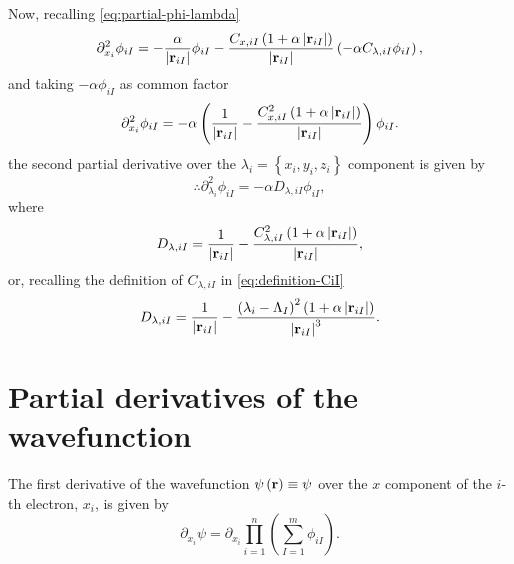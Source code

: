 Now, recalling \cref{eq:partial-phi-lambda}
\begin{equation}
    \partial_{x_{i}}^{2} \phi_{iI}
    =
    -
    \frac{
        \alpha
    }{
        \left| \boldsymbol{\mathrm{r}}_{iI} \right|
    }
    \phi_{iI}
    -
    \frac{
        C_{x,iI}
        \left( 
            1 + \alpha \left| \boldsymbol{\mathrm{r}}_{iI} \right|
        \right)
    }{
        \left| \boldsymbol{\mathrm{r}}_{iI} \right|
    }
    \left( 
        -\alpha
        C_{\lambda,iI}
        \phi_{iI}
    \right)
    ,
\end{equation}
and taking $-\alpha \phi_{iI}$ as common factor
\begin{equation}
    \partial_{x_{i}}^{2} \phi_{iI}
    =
    - \alpha
    \left( 
        \frac{
            1
        }{
            \left| \boldsymbol{\mathrm{r}}_{iI} \right|
        }
        -
        \frac{
            C_{x,iI}^{2}
            \left( 
                1 + \alpha \left| \boldsymbol{\mathrm{r}}_{iI} \right|
            \right)
        }{
            \left| \boldsymbol{\mathrm{r}}_{iI} \right|
        }
    \right)
    \phi_{iI}
    .
\end{equation}
the second partial derivative over the 
$\lambda_i = \left\{ x_i, y_i, z_i \right\}$
component is given by
\begin{equation} \label{eq:partial-2-phi-lambda}
    \therefore
    \partial_{\lambda_{i}}^{2} \phi_{iI}
    =
    -\alpha
    D_{\lambda,iI}
    \phi_{iI}
    ,
\end{equation}
where 
\begin{equation} \label{eq:coeficiente-DiI-CiI}
    D_{\lambda,iI}
    =
    \frac{
        1
    }{
        \left| \boldsymbol{\mathrm{r}}_{iI} \right|
    }
    -
    \frac{
        C_{\lambda,iI}^{2}
        \left( 
            1 + \alpha \left| \boldsymbol{\mathrm{r}}_{iI} \right|
        \right)
    }{
        \left| \boldsymbol{\mathrm{r}}_{iI} \right|
    }
    ,
\end{equation}
or, recalling the definition of $C_{\lambda,iI}$ in \cref{eq:definition-CiI}
\begin{equation} \label{eq:coeficiente-DiI}
    D_{\lambda,iI} =
    \frac{1}{\left| \boldsymbol{\mathrm{r}}_{iI} \right|}
    -
    \frac{
        \left( \lambda_i - \Lambda_I \right)^{2}
        \left(  
            1 + \alpha \left| \boldsymbol{\mathrm{r}}_{iI} \right|
        \right)
    }{
        \left| \boldsymbol{\mathrm{r}}_{iI} \right|^{3}
    }
    .
\end{equation}

\section{Partial derivatives of the wavefunction}
The first derivative of the wavefunction
$\psi \left( \boldsymbol{\mathrm{r}} \right) \equiv \psi$
over the $x$ component of the $i$-th
electron, $x_i$, is given by 
\begin{equation}
    \partial_{x_i} \psi
    =
    \partial_{x_i} \prod_{i=1}^{n} \left( \sum_{I=1}^{m} \phi_{iI} \right)
    .
\end{equation}

